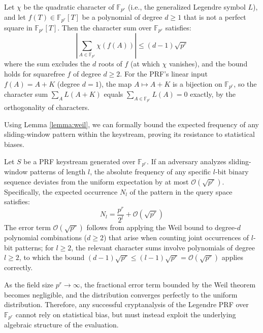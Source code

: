 \documentclass[runningheads]{llncs}
\begin{document}
\begin{lemma} \label{lemma:weil}
Let $\chi$ be the quadratic character of $\mathbb{F}_{p^r}$ (i.e., the generalized Legendre symbol $L$), and let $f(T) \in \mathbb{F}_{p^r}[T]$ be a polynomial of degree $d \geq 1$ that is not a perfect square in $\mathbb{F}_{p^r}[T]$. Then the character sum over $\mathbb{F}_{p^r}$ satisfies:
\begin{equation*}
    \left| \sum_{A \in \mathbb{F}_{p^r}} \chi(f(A)) \right| \leq (d - 1)\sqrt{p^r}
\end{equation*}
where the sum excludes the $d$ roots of $f$ (at which $\chi$ vanishes), and the bound holds for squarefree $f$ of degree $d \geq 2$. For the PRF's linear input $f(A) = A + K$ (degree $d = 1$), the map $A \mapsto A + K$ is a bijection on $\mathbb{F}_{p^r}$, so the character sum $\sum_{A} L(A + K)$ equals $\sum_{A \in \mathbb{F}_{p^r}} L(A) = 0$ exactly, by the orthogonality of characters.
\end{lemma}

Using Lemma \ref{lemma:weil}, we can formally bound the expected frequency of any sliding-window pattern within the keystream, proving its resistance to statistical biases.

\begin{theorem}
Let $S$ be a PRF keystream generated over $\mathbb{F}_{p^r}$. If an adversary analyzes sliding-window patterns of length $l$, the absolute frequency of any specific $l$-bit binary sequence deviates from the uniform expectation by at most $\mathcal{O}(\sqrt{p^r})$. Specifically, the expected occurrence $N_l$ of the pattern in the query space satisfies:
\begin{equation*}
    N_l = \frac{p^r}{2^l} + \mathcal{O}(\sqrt{p^r})
\end{equation*}
The error term $\mathcal{O}(\sqrt{p^r})$ follows from applying the Weil bound to degree-$d$ polynomial combinations ($d \geq 2$) that arise when counting joint occurrences of $l$-bit patterns; for $l \geq 2$, the relevant character sums involve polynomials of degree $l \geq 2$, to which the bound $(d-1)\sqrt{p^r} \leq (l-1)\sqrt{p^r} = \mathcal{O}(\sqrt{p^r})$ applies correctly.
\end{theorem}

As the field size $p^r \to \infty$, the fractional error term bounded by the Weil theorem becomes negligible, and the distribution converges perfectly to the uniform distribution. Therefore, any successful cryptanalysis of the Legendre PRF over $\mathbb{F}_{p^r}$ cannot rely on statistical bias, but must instead exploit the underlying algebraic structure of the evaluation.
\end{document}
